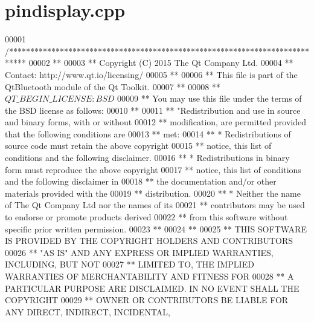 \hypertarget{pindisplay_8cpp_source}{}\section{pindisplay.\+cpp}
\label{pindisplay_8cpp_source}

\begin{DoxyCode}
00001 \textcolor{comment}{/****************************************************************************}
00002 \textcolor{comment}{**}
00003 \textcolor{comment}{** Copyright (C) 2015 The Qt Company Ltd.}
00004 \textcolor{comment}{** Contact: http://www.qt.io/licensing/}
00005 \textcolor{comment}{**}
00006 \textcolor{comment}{** This file is part of the QtBluetooth module of the Qt Toolkit.}
00007 \textcolor{comment}{**}
00008 \textcolor{comment}{** $QT\_BEGIN\_LICENSE:BSD$}
00009 \textcolor{comment}{** You may use this file under the terms of the BSD license as follows:}
00010 \textcolor{comment}{**}
00011 \textcolor{comment}{** "Redistribution and use in source and binary forms, with or without}
00012 \textcolor{comment}{** modification, are permitted provided that the following conditions are}
00013 \textcolor{comment}{** met:}
00014 \textcolor{comment}{**   * Redistributions of source code must retain the above copyright}
00015 \textcolor{comment}{**     notice, this list of conditions and the following disclaimer.}
00016 \textcolor{comment}{**   * Redistributions in binary form must reproduce the above copyright}
00017 \textcolor{comment}{**     notice, this list of conditions and the following disclaimer in}
00018 \textcolor{comment}{**     the documentation and/or other materials provided with the}
00019 \textcolor{comment}{**     distribution.}
00020 \textcolor{comment}{**   * Neither the name of The Qt Company Ltd nor the names of its}
00021 \textcolor{comment}{**     contributors may be used to endorse or promote products derived}
00022 \textcolor{comment}{**     from this software without specific prior written permission.}
00023 \textcolor{comment}{**}
00024 \textcolor{comment}{**}
00025 \textcolor{comment}{** THIS SOFTWARE IS PROVIDED BY THE COPYRIGHT HOLDERS AND CONTRIBUTORS}
00026 \textcolor{comment}{** "AS IS" AND ANY EXPRESS OR IMPLIED WARRANTIES, INCLUDING, BUT NOT}
00027 \textcolor{comment}{** LIMITED TO, THE IMPLIED WARRANTIES OF MERCHANTABILITY AND FITNESS FOR}
00028 \textcolor{comment}{** A PARTICULAR PURPOSE ARE DISCLAIMED. IN NO EVENT SHALL THE COPYRIGHT}
00029 \textcolor{comment}{** OWNER OR CONTRIBUTORS BE LIABLE FOR ANY DIRECT, INDIRECT, INCIDENTAL,}

\end{DoxyCode}
